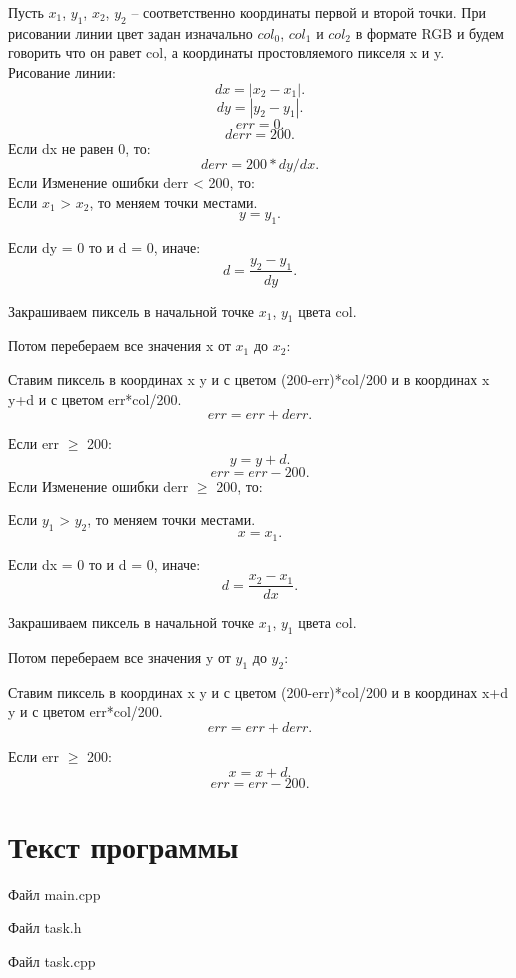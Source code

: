 \documentclass[14pt, a4paper]{extreport}
\begin{document}
Пусть $x_1$, $y_1$, $x_2$, $y_2$ -- соответственно координаты первой и второй точки.
При рисовании линии цвет задан изначально $col_0$, $col_1$ и $col_2$ в формате RGB и будем говорить что он равет col, а координаты простовляемого пикселя x и y.\\
Рисование линии:
$$ dx = |x_2-x_1| . $$
$$ dy = |y_2-y_1| . $$
$$ err = 0 . $$
$$ derr = 200 . $$
Если dx не равен 0, то:
$$ derr = 200*dy/dx . $$
Если Изменение ошибки derr < 200, то: \\

Если $x_1$ > $x_2$, то меняем точки местами.
$$ y = y_1 . $$

Если dy = 0 то и d = 0, иначе:
$$ d = \frac{y_2-y_1}{dy} . $$

Закрашиваем пиксель в начальной точке $x_1$, $y_1$ цвета col.

Потом перебераем все значения x от $x_1$ до $x_2$:

Ставим пиксель в координах x y и с цветом (200-err)*col/200 и в координах x y+d и с цветом err*col/200.
$$ err = err+derr . $$

Если err $\geq$ 200:
$$ y = y+d. $$
$$ err = err-200. $$
Если Изменение ошибки derr $\geq$ 200, то:

Если $y_1$ > $y_2$, то меняем точки местами.
$$ x = x_1 . $$

Если dx = 0 то и d = 0, иначе:
$$ d = \frac{x_2-x_1}{dx} . $$

Закрашиваем пиксель в начальной точке $x_1$, $y_1$ цвета col.

Потом перебераем все значения y от $y_1$ до $y_2$:

Ставим пиксель в координах x y и с цветом (200-err)*col/200 и в координах x+d y и с цветом err*col/200.
$$ err = err+derr . $$

Если err $\geq$ 200:
$$ x = x+d. $$
$$ err = err-200. $$


\chapter{Текст программы}

\noindent Файл main.cpp

\pagebreak
\hrulefill

\noindent Файл task.h

\hrulefill

\noindent Файл task.cpp

\hrulefill
\end{document}
